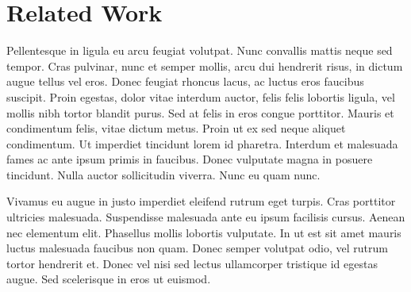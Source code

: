 \section{Related Work}%
Pellentesque in ligula eu arcu feugiat volutpat. Nunc convallis mattis neque sed tempor. Cras pulvinar, nunc et semper mollis, arcu dui hendrerit risus, in dictum augue tellus vel eros. Donec feugiat rhoncus lacus, ac luctus eros faucibus suscipit. Proin egestas, dolor vitae interdum auctor, felis felis lobortis ligula, vel mollis nibh tortor blandit purus. Sed at felis in eros congue porttitor. Mauris et condimentum felis, vitae dictum metus. Proin ut ex sed neque aliquet condimentum. Ut imperdiet tincidunt lorem id pharetra. Interdum et malesuada fames ac ante ipsum primis in faucibus. Donec vulputate magna in posuere tincidunt. Nulla auctor sollicitudin viverra. Nunc eu quam nunc.

Vivamus eu augue in justo imperdiet eleifend rutrum eget turpis. Cras porttitor ultricies malesuada. Suspendisse malesuada ante eu ipsum facilisis cursus. Aenean nec elementum elit. Phasellus mollis lobortis vulputate. In ut est sit amet mauris luctus malesuada faucibus non quam. Donec semper volutpat odio, vel rutrum tortor hendrerit et. Donec vel nisi sed lectus ullamcorper tristique id egestas augue. Sed scelerisque in eros ut euismod. 